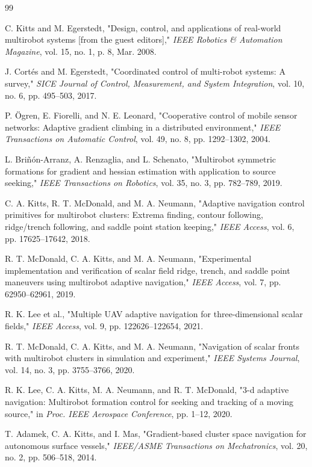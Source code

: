 \documentclass[lettersize,journal]{IEEEtran}
\begin{document}
\balance
\begin{thebibliography}{99}

 C. Kitts and M. Egerstedt, "Design, control, and applications of real-world multirobot systems [from the guest editors]," \textit{IEEE Robotics \& Automation Magazine}, vol. 15, no. 1, p. 8, Mar. 2008.

 J. Cortés and M. Egerstedt, "Coordinated control of multi-robot systems: A survey," \textit{SICE Journal of Control, Measurement, and System Integration}, vol. 10, no. 6, pp. 495--503, 2017.

 P. Ögren, E. Fiorelli, and N. E. Leonard, "Cooperative control of mobile sensor networks: Adaptive gradient climbing in a distributed environment," \textit{IEEE Transactions on Automatic Control}, vol. 49, no. 8, pp. 1292--1302, 2004.

 L. Briñón-Arranz, A. Renzaglia, and L. Schenato, "Multirobot symmetric formations for gradient and hessian estimation with application to source seeking," \textit{IEEE Transactions on Robotics}, vol. 35, no. 3, pp. 782--789, 2019.

 C. A. Kitts, R. T. McDonald, and M. A. Neumann, "Adaptive navigation control primitives for multirobot clusters: Extrema finding, contour following, ridge/trench following, and saddle point station keeping," \textit{IEEE Access}, vol. 6, pp. 17625--17642, 2018.

 R. T. McDonald, C. A. Kitts, and M. A. Neumann, "Experimental implementation and verification of scalar field ridge, trench, and saddle point maneuvers using multirobot adaptive navigation," \textit{IEEE Access}, vol. 7, pp. 62950--62961, 2019.

 R. K. Lee et al., "Multiple UAV adaptive navigation for three-dimensional scalar fields," \textit{IEEE Access}, vol. 9, pp. 122626--122654, 2021.

 R. T. McDonald, C. A. Kitts, and M. A. Neumann, "Navigation of scalar fronts with multirobot clusters in simulation and experiment," \textit{IEEE Systems Journal}, vol. 14, no. 3, pp. 3755--3766, 2020.

 R. K. Lee, C. A. Kitts, M. A. Neumann, and R. T. McDonald, "3-d adaptive navigation: Multirobot formation control for seeking and tracking of a moving source," in \textit{Proc. IEEE Aerospace Conference}, pp. 1--12, 2020.

 T. Adamek, C. A. Kitts, and I. Mas, "Gradient-based cluster space navigation for autonomous surface vessels," \textit{IEEE/ASME Transactions on Mechatronics}, vol. 20, no. 2, pp. 506--518, 2014.


\end{thebibliography}
\end{document}
